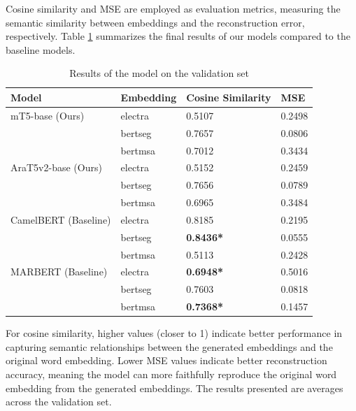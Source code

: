 \documentclass[15pt]{article}
\begin{document}
Cosine similarity and MSE are employed as evaluation metrics, measuring the semantic similarity between embeddings and the reconstruction error, respectively. Table \ref{table:results} summarizes the final results of our models compared to the baseline models.

\begin{table}[H]
    \centering
    \caption{Results of the model on the validation set}
    \label{table:results}
    \renewcommand{\arraystretch}{1.5}%
    \begin{tabularx}{\textwidth}{|>{\raggedright}X|>{\raggedright\arraybackslash}X|X|X|}
        \hline
        \textbf{Model} & \textbf{Embedding} & \textbf{Cosine Similarity} & \textbf{MSE} \\
        \hline
        mT5-base (Ours) & electra & 0.5107 & 0.2498 \\\cline{2-4}
        & bertseg & 0.7657 & 0.0806 \\\cline{2-4}
        & bertmsa & 0.7012 & 0.3434 \\\cline{2-4}
        \hline
        AraT5v2-base (Ours) & electra & 0.5152 & 0.2459 \\\cline{2-4}
        & bertseg & 0.7656 & 0.0789 \\\cline{2-4}
        & bertmsa & 0.6965 & 0.3484 \\\cline{2-4}
        \hline
        CamelBERT (Baseline) & electra & 0.8185 & 0.2195 \\\cline{2-4}
        & bertseg & \textbf{0.8436*} & 0.0555 \\\cline{2-4}
        & bertmsa & 0.5113 & 0.2428 \\\cline{2-4}
        \hline
        MARBERT (Baseline) & electra & \textbf{0.6948*} & 0.5016 \\\cline{2-4}
        & bertseg & 0.7603 & 0.0818 \\\cline{2-4}
        & bertmsa & \textbf{0.7368*} & 0.1457 \\\cline{2-4}
        \hline
    \end{tabularx}
\end{table}

For cosine similarity, higher values (closer to 1) indicate better performance in capturing semantic relationships between the generated embeddings and the original word embedding. Lower MSE values indicate better reconstruction accuracy, meaning the model can more faithfully reproduce the original word embedding from the generated embeddings. The results presented are averages across the validation set.
\end{document}
